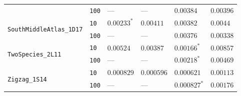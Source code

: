 \documentclass{article}
\begin{document}
\begin{footnotesize}
\begin{tabular}{llllll}
 & \texttt{100} & --- & --- & $\mathbf{0.00384}$ & $0.00396$ \\
\cline{1-6}
\multirow[c]{2}{*}{\texttt{SouthMiddleAtlas\_1D17}} & \texttt{10} & $\mathbf{0.00233}^*$ & $0.00411$ & $0.00382$ & $0.0044$ \\
 & \texttt{100} & --- & --- & $0.00376$ & $\mathbf{0.00338}$ \\
\cline{1-6}
\multirow[c]{2}{*}{\texttt{TwoSpecies\_2L11}} & \texttt{10} & $0.00524$ & $0.00387$ & $\mathbf{0.00166}^*$ & $0.00857$ \\
 & \texttt{100} & --- & --- & $\mathbf{0.00218}^*$ & $0.00469$ \\
\cline{1-6}
\multirow[c]{2}{*}{\texttt{Zigzag\_1S14}} & \texttt{10} & $0.000829$ & $\mathbf{0.000596}$ & $0.000621$ & $0.00113$ \\
 & \texttt{100} & --- & --- & $\mathbf{0.000827}^*$ & $0.00176$ \\
\cline{1-6}
\bottomrule
\end{tabular}
\end{footnotesize}
\end{document}
